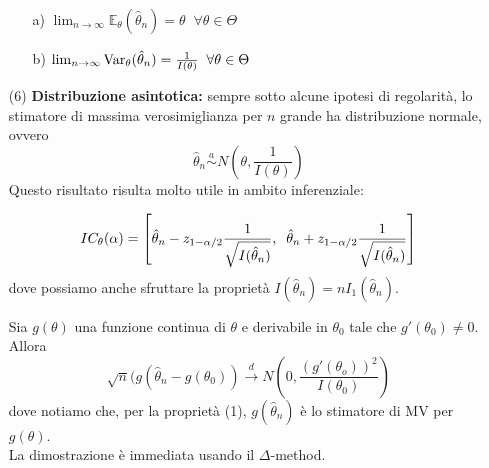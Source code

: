 \begin{enumerate}
\begin{enumerate}
\item[a)] $\lim_{n \rightarrow \infty} \mathbb{E}_{\theta}(\hat{\theta}_n)=\theta \; \; \forall \theta \in \Theta$
\item[b)] $\lim_{n \rightarrow \infty} \operatorname{Var}_{\theta}(\hat{\theta}_n)=\frac{1}{I(\theta)} \; \; \forall \theta \in \Theta$
\end{enumerate}
\item[(6)] \textbf{Distribuzione asintotica:} sempre sotto alcune ipotesi di regolarità, lo stimatore di massima verosimiglianza per $n$ grande ha distribuzione normale, ovvero
$$\hat{\theta}_n \stackrel{a}{\sim} N \left( \theta, \frac{1}{I(\theta)} \right)$$
Questo risultato risulta molto utile in ambito inferenziale:
\begin{esempio}
$$IC_{\theta}(\-\alpha)=\left[ \hat{\theta}_n - z_{1-\alpha/2} \frac{1}{\sqrt{I(\hat{\theta}_n)}}, \; \; \hat{\theta}_n + z_{1-\alpha/2} \frac{1}{\sqrt{I(\hat{\theta}_n)}} \right]$$
dove possiamo anche sfruttare la proprietà $I(\hat{\theta}_n)= n I_1(\hat{\theta}_n)$.
\end{esempio}
\begin{oss}
Sia $g(\theta)$ una funzione continua di $\theta$ e derivabile in $\theta_0$ tale che $g'(\theta_0) \neq 0$. Allora
$$\sqrt{n} (g(\hat{\theta}_n - g(\theta_0)) \stackrel{d}{\longrightarrow} N \left( 0, \frac{(g'(\theta_o))^2}{I(\theta_0)} \right)$$
dove notiamo che, per la proprietà (1), $g(\hat{\theta}_n)$ è lo stimatore di MV per $g(\theta)$.\\
La dimostrazione è immediata usando il $\Delta$-method.
\\
\\
\end{oss}
\end{enumerate}